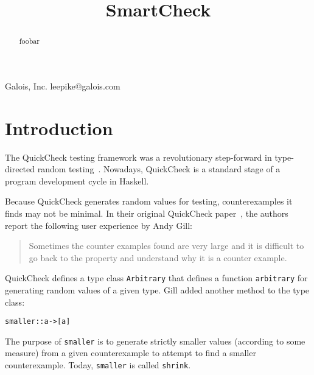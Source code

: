 \documentclass[9pt]{sigplanconf}
\newenvironment{code}{\begin{alltt}\footnotesize}{\end{alltt}}
\newcommand{\ttp}[1]{\texttt{#1}}
\begin{document}


\title{SmartCheck}

           {Galois, Inc.}
           {leepike@galois.com}
\maketitle

\begin{abstract}
foobar
\end{abstract}





\section{Introduction}\label{sec:intro}

The QuickCheck testing framework was a revolutionary step-forward in
type-directed random testing~\cite{qc}.  Nowadays, QuickCheck is a standard
stage of a program development cycle in Haskell.

Because QuickCheck generates random values for testing, counterexamples it finds
may not be minimal.  In their original QuickCheck paper~\cite{qc}, the authors
report the following user experience by Andy Gill:
%
\begin{quote}
Sometimes the counter examples found are very large and it is difficult to go
back to the property and understand why it is a counter example.
\end{quote}
%
\noindent
QuickCheck defines a type class \ttp{Arbitrary} that defines a function
\ttp{arbitrary} for generating random values of a given type.  Gill added another
method to the type class:
%
\begin{code}
smaller :: a -> [a] 
\end{code}
%
\noindent
The purpose of \ttp{smaller} is to generate strictly smaller values (according to
some measure) from a given counterexample to attempt to find a smaller
counterexample.  Today, \ttp{smaller} is called \ttp{shrink}.
\end{document}
